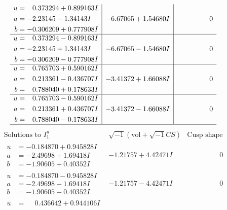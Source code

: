 \documentclass[1p]{elsarticle_modified}
\theoremstyle{definition}
\newcommand{\I}{\sqrt{-1}}
\begin{document}
$$\begin{array}{c|c|c}
\begin{aligned}
u &= \phantom{-}0.373294 + 0.899163 I \\
a &= -2.23145 - 1.34143 I \\
b &= -0.306209 + 0.777908 I\end{aligned}
 & -6.67065 + 1.54680 I & \phantom{-0.000000 } 0 \\ \hline\begin{aligned}
u &= \phantom{-}0.373294 - 0.899163 I \\
a &= -2.23145 + 1.34143 I \\
b &= -0.306209 - 0.777908 I\end{aligned}
 & -6.67065 - 1.54680 I & \phantom{-0.000000 } 0 \\ \hline\begin{aligned}
u &= \phantom{-}0.765703 + 0.590162 I \\
a &= \phantom{-}0.213361 - 0.436707 I \\
b &= \phantom{-}0.788040 + 0.178633 I\end{aligned}
 & -3.41372 + 1.66088 I & \phantom{-0.000000 } 0 \\ \hline\begin{aligned}
u &= \phantom{-}0.765703 - 0.590162 I \\
a &= \phantom{-}0.213361 + 0.436707 I \\
b &= \phantom{-}0.788040 - 0.178633 I\end{aligned}
 & -3.41372 - 1.66088 I & \phantom{-0.000000 } 0\\
 \hline 
 \end{array}$$\newpage$$\begin{array}{c|c|c}  
\text{Solutions to }I^u_{1}& \I (\text{vol} + \sqrt{-1}CS) & \text{Cusp shape}\\
 \hline 
\begin{aligned}
u &= -0.184870 + 0.945828 I \\
a &= -2.49698 + 1.69418 I \\
b &= -1.90605 + 0.40352 I\end{aligned}
 & -1.21757 + 4.42471 I & \phantom{-0.000000 } 0 \\ \hline\begin{aligned}
u &= -0.184870 - 0.945828 I \\
a &= -2.49698 - 1.69418 I \\
b &= -1.90605 - 0.40352 I\end{aligned}
 & -1.21757 - 4.42471 I & \phantom{-0.000000 } 0 \\ \hline\begin{aligned}
u &= \phantom{-}0.436642 + 0.944106 I \\

\end{aligned}
\end{array}$$
\end{document}
